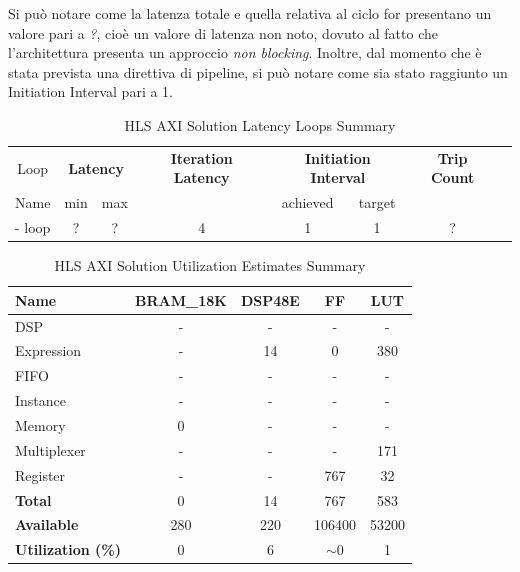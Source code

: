 Si può notare come la latenza totale e quella relativa al ciclo for presentano un valore pari a \textit{?}, cioè un valore di latenza non noto, dovuto al fatto che l'architettura presenta un approccio \textit{non blocking}. Inoltre, dal momento che è stata prevista una direttiva di pipeline, si può notare come sia stato raggiunto un Initiation Interval pari a 1.

\begin{table}[H]
	\centering
	\begin{tabular}{|c|c|c|c|c|c|c|c|}
		\hline
		\multicolumn{1}{|c|}{Loop} & \multicolumn{2}{|c|}{\textbf{Latency}} & \multicolumn{1}{c|}{\textbf{Iteration Latency}} & \multicolumn{2}{c|}{\textbf{Initiation Interval}} & \multicolumn{1}{c|}{\textbf{Trip Count}}  \\
		Name & min & max & & achieved & target &  \\
		\hline
		- loop & ? & ? & 4  & 1 & 1 & ? \\
		\hline
	\end{tabular}
	\caption{HLS AXI Solution Latency Loops Summary }
	\label{tab:hls-axi-solution-loop-summary}
\end{table}

\begin{table}[H]
	\centering
	\begin{tabular}{|l|c|c|c|c|}
		\hline
		\textbf{Name}    & \textbf{BRAM\_18K} & \textbf{DSP48E} & \textbf{FF} & \textbf{LUT} \\ \hline
		DSP              & -                   & -               & -           & -            \\ 
		Expression       & -                   & 14               & 0           & 380          \\ 
		FIFO             & -                   & -               & -           & -            \\ 
		Instance         & -                   & -               & -           & -            \\ 
		Memory           & 0                   & -               & -          & -            \\ 
		Multiplexer      & -                   & -               & -           & 171          \\ 
		Register         & -                   & -               & 767         & 32            \\ \hline
		\textbf{Total}   & 0                   & 14               & 767         & 583          \\ \hline
		\textbf{Available} & 280               & 220             & 106400      & 53200        \\ \hline
		\textbf{Utilization (\%)} & 0            & 6              & $\sim$0     & 1      \\ \hline
	\end{tabular}
	\caption{HLS AXI Solution Utilization Estimates Summary}
	\label{tab:hls-axi-solution-utilization-estimates-summary}
\end{table}


